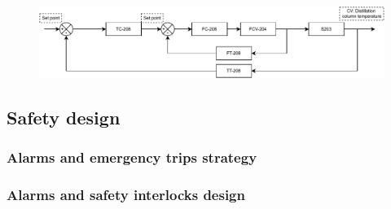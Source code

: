 \begin{figure}[H]
    \centering
    \includegraphics[width=\linewidth]{chapters/4-operation-control/4-Figures/S203C-TC.pdf}
    \caption{}
    \label{fig:S203C-TC}
\end{figure}


\subsubsection{}

\subsection{Safety design}

\subsubsection{Alarms and emergency trips strategy}

\subsubsection{Alarms and safety interlocks design}
